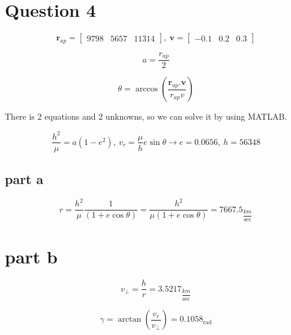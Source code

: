 \section{Question 4}

$$
\boldsymbol{r}_{ap}=\begin{bmatrix}
    9798 &
    5657 &
    11314
\end{bmatrix}, ~ 
\boldsymbol{v}=\begin{bmatrix}
    -0.1 &
    0.2 &
    0.3
\end{bmatrix}
$$

$$
a = \dfrac{r_{ap}}{2}
$$

$$
\theta = \arccos\left(\dfrac{\boldsymbol{r}_{ap}.\boldsymbol{v}}{r_{ap}v}\right)
$$

There is 2 equations and 2 unknowns, so we can solve it by using MATLAB.

$$
\dfrac{h^2}{\mu} = a(1-e^2),~ v_r = \dfrac{\mu}{h}e\sin\theta \to e = 0.0656,~ h = 56348
$$

\subsection{part a}

$$
r = \dfrac{h^2}{\mu}\dfrac{1}{(1+e\cos\theta)} = \dfrac{h^2}{\mu(1+e\cos\theta)} = 7667.5_{\dfrac{km}{\sec}}
$$

\section{part b}

$$
v_{\perp} = \dfrac{h}{r} = 3.5217_{\dfrac{km}{\sec}}
$$

$$
\gamma = \arctan\left(\dfrac{v_r}{v_{\perp}}\right) = 0.1058
_{\text{rad}}
$$





